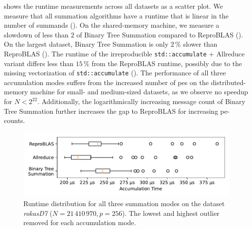  shows the runtime measurements across all datasets as a scatter plot.
We measure that all summation algorithms have a runtime that is linear in the number of summands ().
On the shared-memory machine, we measure a slowdown of less than $2$ of Binary Tree Summation compared to ReproBLAS ().
On the largest dataset, Binary Tree Summation is only $2\,\%$ slower than ReproBLAS ().
The runtime of the irreproducible \texttt{std::accumulate} + Allreduce variant differs less than $15\,\%$ from the ReproBLAS runtime, possibly due to the missing vectorization of \texttt{std::accumulate} ().
The performance of all three accumulation modes suffers from the increased number of \glspl{pe} on the distributed-memory machine for small- and medium-sized datasets, as we observe no speedup for $N < 2^{22}$.
Additionally, the logarithmically increasing message count of Binary Tree Summation further increases the gap to ReproBLAS for increasing \gls{pe}-counts.\@

\begin{figure}
\centering
\includegraphics[scale=0.75]{figures/boxplotRokasD7.pdf}
\caption{Runtime distribution for all three summation modes on the dataset \textit{rokasD7} ($N = 21\,410\,970, p = 256$). The lowest and highest outlier removed for each accumulation mode.}
\label{fig:boxplotRokasD7}
\end{figure}


